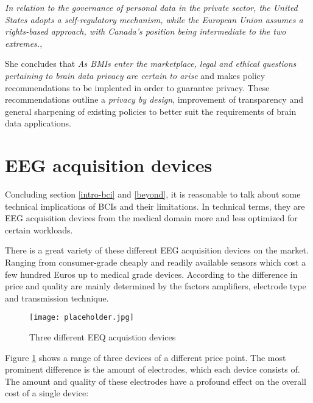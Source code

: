                 \medskip
                \emph{In relation to the governance of personal data in the private sector, the United States adopts a self-regulatory mechanism, while the European Union assumes a rights-based approach, with Canada's position being intermediate to the two extremes.}, \cite{Greenberg.2019}
                \medskip

                She concludes that \emph{As BMIs enter the marketplace, legal and ethical questions pertaining to brain data privacy are certain to arise}\cite[43]{Greenberg.2019} and makes policy recommendations to be implented in order to guarantee privacy. These recommendations outline a \textit{privacy by design}, improvement of transparency and general sharpening of existing policies to better suit the requirements of brain data applications.

        \section{EEG acquisition devices}

            Concluding section \ref*{intro-bci} and \ref*{beyond}, it is reasonable to talk about some technical implications of BCIs and their limitations. In technical terms, they are EEG acquisition devices from the medical domain more and less optimized for certain workloads.

            There is a great variety of these different EEG acquisition devices on the market. Ranging from consumer-grade cheaply and readily available sensors which cost a few hundred Euros up to medical grade devices. According to \cite{Zerafa.2018} the difference in price and quality are mainly determined by the factors amplifiers, electrode type and transmission technique.
                
            \begin{figure}[h]     %
                \centering
                \texttt{[image: placeholder.jpg]} 
                \caption{Three different EEQ acquistion devices }\label{eeg-devices}
            \end{figure}

            Figure \ref*{eeg-devices} shows a range of three devices of a different price point. The most prominent difference is the amount of electrodes, which each device consists of. The amount and quality of these electrodes have a profound effect on the overall cost of a single device:


